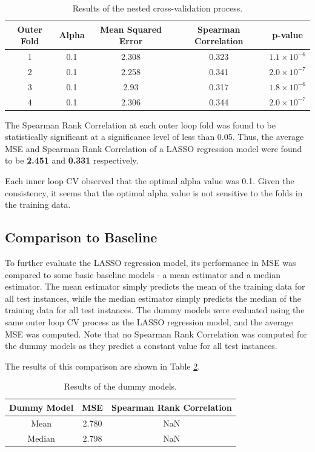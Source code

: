 \documentclass[12pt]{article}
\begin{document}
\begin{table}[H]
    \centering
    \begin{tabular}{|c|c|c|c|c|}
        \hline
        Outer Fold & Alpha & Mean Squared Error & Spearman Correlation & p-value \\
        \hline
        1 & 0.1 & 2.308 & 0.323 & $1.1 \times 10^{-6}$ \\
        2 & 0.1 & 2.258 & 0.341 & $2.0 \times 10^{-7}$ \\
        3 & 0.1 & 2.93 & 0.317 & $1.8 \times 10^{-6}$ \\
        4 & 0.1 & 2.306 & 0.344 & $2.0 \times 10^{-7}$ \\
        \hline
    \end{tabular}
    \caption{Results of the nested cross-validation process.}
    \label{tab:regression_results}
\end{table}

\vspace{-0.5cm}

The Spearman Rank Correlation at each outer loop fold was found to be statistically significant at a significance level of less than 0.05. Thus, the average MSE and Spearman Rank Correlation of a LASSO regression model were found to be \textbf{2.451} and \textbf{0.331} respectively.

Each inner loop CV observed that the optimal alpha value was 0.1. Given the consistency, it seems that the optimal alpha value is not sensitive to the folds in the training data. 

\subsection{Comparison to Baseline}
To further evaluate the LASSO regression model, its performance in MSE was compared to some basic baseline models - a mean estimator and a median estimator. The mean estimator simply predicts the mean of the training data for all test instances, while the median estimator simply predicts the median of the training data for all test instances. The dummy models were evaluated using the same outer loop CV process as the LASSO regression model, and the average MSE was computed. Note that no Spearman Rank Correlation was computed for the dummy models as they predict a constant value for all test instances.

The results of this comparison are shown in Table \ref{tab:regression_baseline}.

\begin{table}[H]
    \centering
    \begin{tabular}{|c|c|c|}
        \hline
        Dummy Model & MSE & Spearman Rank Correlation \\
        \hline
        Mean & 2.780 & NaN \\
        Median & 2.798 & NaN \\
        \hline
    \end{tabular}
    \caption{Results of the dummy models.}
    \label{tab:regression_baseline}
\end{table}
\end{document}
